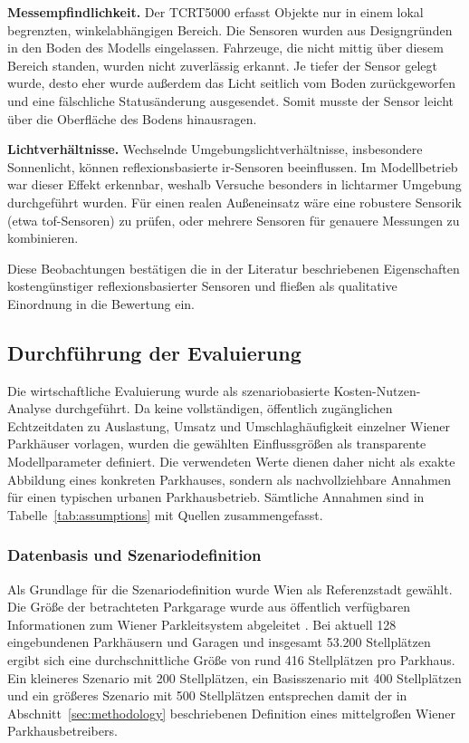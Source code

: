 \textbf{Messempfindlichkeit.} Der TCRT5000 erfasst Objekte nur in einem lokal begrenzten, winkelabhängigen Bereich. Die Sensoren wurden aus Designgründen in den Boden des Modells eingelassen. Fahrzeuge, die nicht mittig über diesem Bereich standen, wurden nicht zuverlässig erkannt. Je tiefer der Sensor gelegt wurde, desto eher wurde außerdem das Licht seitlich vom Boden zurückgeworfen und eine fälschliche Statusänderung ausgesendet. Somit musste der Sensor leicht über die Oberfläche des Bodens hinausragen.

\textbf{Lichtverhältnisse.} Wechselnde Umgebungslichtverhältnisse, insbesondere Sonnenlicht, können reflexionsbasierte \ac{ir}-Sensoren beeinflussen. Im Modellbetrieb war dieser Effekt erkennbar, weshalb Versuche besonders in lichtarmer Umgebung durchgeführt wurden. Für einen realen Außeneinsatz wäre eine robustere Sensorik (etwa \ac{tof}-Sensoren) zu prüfen, oder mehrere Sensoren für genauere Messungen zu kombinieren.

Diese Beobachtungen bestätigen die in der Literatur beschriebenen Eigenschaften kostengünstiger reflexionsbasierter Sensoren \citep{perkovicSmartParkingSensors2020} und fließen als qualitative Einordnung in die Bewertung ein.

\subsection{Durchführung der Evaluierung}

Die wirtschaftliche Evaluierung wurde als szenariobasierte Kosten-Nutzen-Analyse durchgeführt. Da keine vollständigen, öffentlich zugänglichen Echtzeitdaten zu Auslastung, Umsatz und Umschlaghäufigkeit einzelner Wiener Parkhäuser vorlagen, wurden die gewählten Einflussgrößen als transparente Modellparameter definiert. Die verwendeten Werte dienen daher nicht als exakte Abbildung eines konkreten Parkhauses, sondern als nachvollziehbare Annahmen für einen typischen urbanen Parkhausbetrieb. Sämtliche Annahmen sind in Tabelle~\ref{tab:assumptions} mit Quellen zusammengefasst.

\subsubsection{Datenbasis und Szenariodefinition}

Als Grundlage für die Szenariodefinition wurde Wien als Referenzstadt gewählt. Die Größe der betrachteten Parkgarage wurde aus öffentlich verfügbaren Informationen zum Wiener Parkleitsystem abgeleitet \citep{stadtwienParkleitsystemFuerWien2026}. Bei aktuell 128 eingebundenen Parkhäusern und Garagen und insgesamt 53.200 Stellplätzen ergibt sich eine durchschnittliche Größe von rund 416 Stellplätzen pro Parkhaus. Ein kleineres Szenario mit 200 Stellplätzen, ein Basisszenario mit 400 Stellplätzen und ein größeres Szenario mit 500 Stellplätzen entsprechen damit der in Abschnitt~\ref{sec:methodology} beschriebenen Definition eines mittelgroßen Wiener Parkhausbetreibers.

